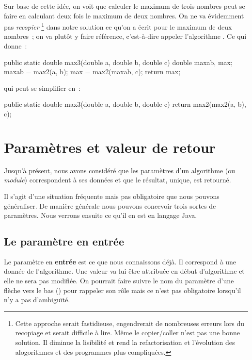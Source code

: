 	Sur base de cette idée, 
	on voit que calculer le maximum de trois nombres
	peut se faire en calculant deux fois le maximum de deux nombres.
	On ne va évidemment pas \emph{recopier}%
	\footnote{
		Cette approche serait fastidieuse,
		engendrerait de nombreuses erreurs lors du recopiage
		et serait difficile à lire. Même le copier/coller n'est pas une bonne 
		solution. Il diminue la lisibilité et rend la refactorisation et 
		l'évolution des alogorithmes et des programmes plus compliquées.
	} dans notre solution
	ce qu’on a écrit pour le maximum de deux nombres~;
	on va plutôt y faire référence, 
	c’est-à-dire appeler l’algorithme . 
	Ce qui donne~:

	\begin{java}
public static double max3(double a, double b, double c){
	double maxab, max;
	maxab = max2(a, b);
	max = max2(maxab, c);
	return max;
}
	\end{java}

	qui peut se simplifier en~:
	
	\begin{java}
public static double max3(double a, double b, double c){
	return max2(max2(a, b), c);
}
	\end{java}

\section{Paramètres et valeur de retour}
\label{paramètres}

	Jusqu’à présent, nous avons considéré que les paramètres d’un algorithme
	(ou \emph{module}) correspondent à ses données et que le
	résultat, unique, est retourné.

	Il s’agit d’une situation fréquente mais pas obligatoire que nous pouvons
	généraliser.  De manière générale nous pouvons concevoir trois sortes de
	paramètres. Nous verrons ensuite ce qu'il en est en langage Java. 

	\subsection{Le paramètre en entrée}
	\label{param.entrée}

		Le paramètre en \textbf{entrée} est ce que nous connaissons déjà.  Il
		correspond à une donnée de l’algorithme.  Une valeur va lui être
		attribuée en début d’algorithme et elle ne sera pas modifiée.  On pourrait
		faire suivre le nom du paramètre d’une flèche vers le bas (\In) pour
		rappeler son rôle mais ce n'est pas obligatoire lorsqu'il n'y a pas
		d'ambiguïté.
		
